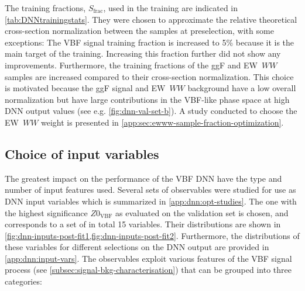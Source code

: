 The training fractions, $S_\text{frac}$, used in the training are indicated in \cref{tab:DNNtrainingstats}. They were chosen to approximate the relative theoretical cross-section normalization between the samples at preselection, with some exceptions: The VBF signal training fraction is increased to 5\% because it is the main target of the training. Increasing this fraction further did not show any improvements. Furthermore, the training fractions of the ggF and EW~$WW$ samples are increased compared to their cross-section normalization. 
This choice is motivated because the ggF signal and EW~$WW$ background have a low overall normalization but have large contributions in the VBF-like phase space at high DNN output values (see e.g. \cref{fig:dnn-val-set-b}). 
A study conducted to choose the EW~$WW$ weight is presented in \cref{app:sec:ewww-sample-fraction-optimization}.

\subsection{Choice of input variables}
\label{subsec:input-variables-opt}
The greatest impact on the performance of the VBF DNN have the type and number of input features used.
Several sets of observables were studied for use as DNN input variables which is summarized in \cref{app:dnn:opt-studies}.
The one with the highest significance $Z0_\mathrm{VBF}$ as evaluated on the validation set is chosen, and corresponds to a set of in total 15 variables.
Their distributions are shown in \cref{fig:dnn-inputs-post-fit1,fig:dnn-inputs-post-fit2}.
Furthermore, the distributions of these variables for different selections on the DNN output are provided in \cref{app:dnn:input-vars}. 
The observables exploit various features of the VBF signal process (see \cref{subsec:signal-bkg-characterisation}) that can be grouped into three categories:

